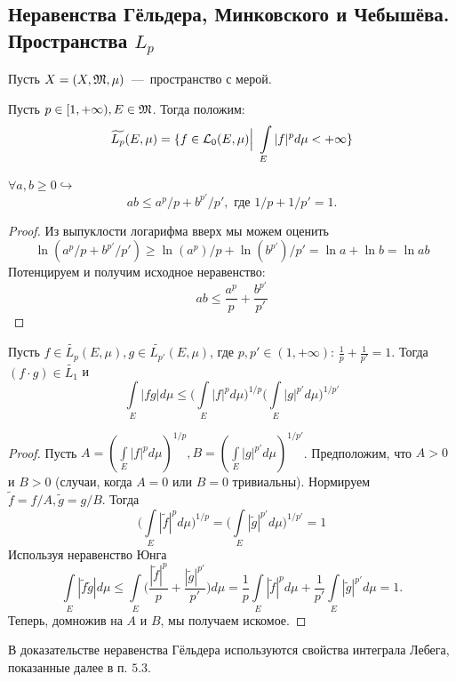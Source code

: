 \subsection{Неравенства Гёльдера, Минковского и Чебышёва. Пространства $L_p$}
Пусть $X = (X, \mathfrak{M}, \mu)$~---~пространство с мерой.
\begin{definition}
    Пусть $p \in [1, +\infty), E \in \mathfrak{M}$. Тогда положим:\[\widetilde{L_p}(E, \mu) = \{f \in \mathcal{L}_0(E, \mu) \Big | \ \int\limits_E |f|^pd\mu < +\infty\}\]
\end{definition}
\begin{lemma}
    $\forall a, b \geq 0 \hookrightarrow $
    \[ab \leq a^p/p + b^{p'}/p',\text{ где }1/p + 1/p' = 1.\]
\end{lemma}
\begin{proof}
    Из выпуклости логарифма вверх  мы можем оценить
    $$\ln(a^p/p + b^{p'}/p') \geq \ln(a^p)/p + \ln(b^{p'})/p' = \ln a + \ln b = \ln ab$$ Потенцируем и получим исходное неравенство:
    \[ab \leq \dfrac{a^p}{p} + \dfrac{b^{p'}}{p'}\]
\end{proof}

\hypertarget{gyolder}{}
\begin{theorem}
    Пусть $f \in \widetilde{L_p}(E, \mu), g \in \widetilde{L_{p'}}(E, \mu)$, где $p, p' \in (1, +\infty)$: $\frac{1}{p} + \frac{1}{p'} = 1$. Тогда $(f\cdot g) \in \widetilde{L_1}$ и \[\int\limits_E |fg|d\mu \leq \Bigg(\int\limits_E |f|^p d\mu\Bigg)^{1/p}\Bigg(\int\limits_E |g|^{p'}d\mu \Bigg)^{1/{p'}}\]
\end{theorem}

\begin{proof}
        Пусть $A = (\int\limits_E |f|^pd\mu)^{1/p}, B = (\int\limits_E |g|^{p'}d\mu)^{1/p'}$. Предположим, что $A > 0$ и $B > 0$ (случаи, когда $A = 0$ или $B = 0$ тривиальны). Нормируем $\widetilde{f} = f/A, \widetilde{g} = g/B$. Тогда \[\Bigg(\int\limits_E |\widetilde{f}|^p d\mu \Bigg)^{1/p} = \Bigg(\int\limits_E |\widetilde{g}|^{p'} d\mu\Bigg)^{1/p'} = 1\]
    Используя неравенство Юнга \[\int\limits_E |\widetilde{f}\widetilde{g}|d\mu \leq \int\limits_E {\Bigg(\dfrac{|\widetilde{f}|^p}{p} + \dfrac{|\widetilde{g}|^{p'}}{p'}\Bigg)}d\mu = \dfrac{1}{p}\int\limits_E |\widetilde{f}|^pd\mu + \frac{1}{p'}\int\limits_E |\widetilde{g}|^{p'}d\mu = 1.\]
    Теперь, домножив на $A$ и $B$, мы получаем искомое.
\end{proof}



\begin{note}
    В доказательстве неравенства Гёльдера используются свойства интеграла Лебега, показанные далее в п. $5.3$.
\end{note}

